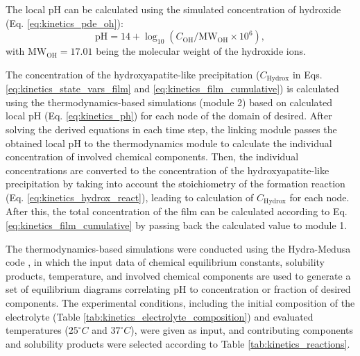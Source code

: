The local pH can be calculated using the simulated concentration of hydroxide (Eq. \ref{eq:kinetics_pde_oh}):
\begin{equation} \label{eq:kinetics_ph}
\mathrm{pH} = 14 + \log_{10}\left(C_{\mathrm{OH}} / \mathrm{MW}_{\mathrm{OH}} \times 10^6\right),
\end{equation}
with $\mathrm{MW}_{\mathrm{OH}}=17.01$ being the molecular weight of the hydroxide ions.

The concentration of the hydroxyapatite-like precipitation ($C_{\mathrm{Hydrox}}$ in Eqs. \ref{eq:kinetics_state_vars_film} and \ref{eq:kinetics_film_cumulative}) is calculated using the thermodynamics-based simulations (module 2) based on calculated local pH (Eq. \ref{eq:kinetics_ph}) for each node of the domain of desired. After solving the derived equations in each time step, the linking module passes the obtained local pH to the thermodynamics module to calculate the individual concentration of involved chemical components. Then, the individual concentrations are converted to the concentration of the hydroxyapatite-like precipitation by taking into account the stoichiometry of the formation reaction (Eq. \ref{eq:kinetics_hydrox_react}), leading to calculation of $C_{\mathrm{Hydrox}}$ for each node. After this, the total concentration of the film can be calculated according to Eq. \ref{eq:kinetics_film_cumulative} by passing back the calculated value to module 1.

The thermodynamics-based simulations were conducted using the Hydra-Medusa code \cite{Ingri1967, Warnqvist1971, Eriksson1979}, in which the input data of chemical equilibrium constants, solubility products, temperature, and involved chemical components are used to generate a set of equilibrium diagrams correlating pH to concentration or fraction of desired components. The experimental conditions, including the initial composition of the electrolyte (Table \ref{tab:kinetics_electrolyte_composition}) and evaluated temperatures ($25^{\circ}C$ and $37^{\circ}C$), were given as input, and contributing components and solubility products were selected according to Table \ref{tab:kinetics_reactions}.


